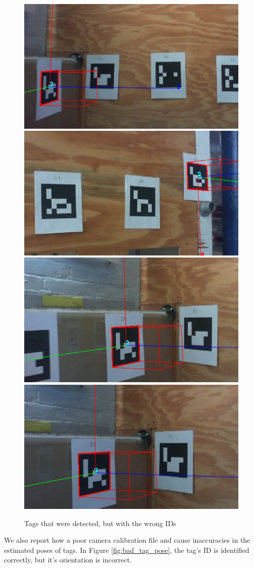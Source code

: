 \documentclass{article}
\begin{document}
    \begin{figure}[H]
      \centering
      \includegraphics[width=0.49\linewidth]{./images/misidentified_tag_1.png}
      \includegraphics[width=0.49\linewidth]{./images/misidentified_tag_2.png}
      \includegraphics[width=0.49\linewidth]{./images/misidentified_tag_3.png}
      \includegraphics[width=0.49\linewidth]{./images/misidentified_tag_4.png}
      \caption{Tags that were detected, but with the wrong IDs}
      \label{fig:misdetected_tags}
    \end{figure}

    We also report how a poor camera calibration file and cause inaccuracies in the estimated poses of tags. In Figure \ref{fig:bad_tag_pose}, the tag's ID is identified correctly, but it's orientation is incorrect.
\end{document}
